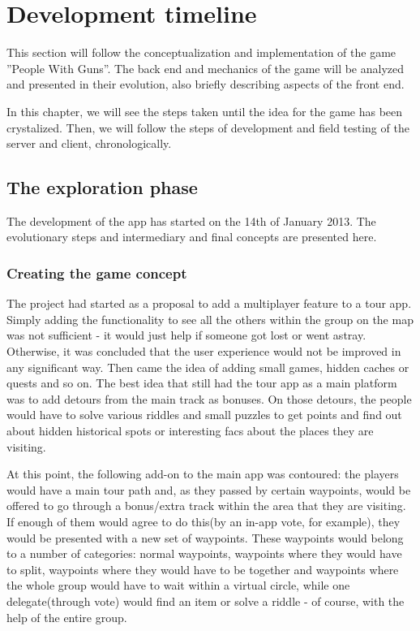 \section{Development timeline}

This section will follow the conceptualization and implementation of
the game ''People With Guns''. The back end and mechanics of the game will be
analyzed and presented in their evolution, also briefly describing aspects of
the front end. \newline

In this chapter, we will see the steps taken until the idea for the game has
been crystalized. Then, we will follow the steps of development and field
testing of the server and client, chronologically.


\subsection{The exploration phase}

The development of the app has started on the 14th of January 2013.
The evolutionary steps and intermediary and final concepts are presented here.\newline

\subsubsection{Creating the game concept}

The project had started as a proposal to add a multiplayer feature to a tour
app. Simply adding the functionality to see all the others within the group on
the map was not sufficient - it would just help if someone got lost or went
astray. Otherwise, it was concluded that the user experience would not be
improved in any significant way. Then came the idea of adding small games,
hidden caches or quests and so on. The best idea that still had the tour app as
a main platform was to add detours from the main track as bonuses. On those
detours, the people would have to solve various riddles and small puzzles to get
points and find out about hidden historical spots or interesting facs about the
places they are visiting. \newline

At this point, the following add-on to the main app was contoured: the
players would have a main tour path and, as they passed by certain waypoints,
would be offered to go through a bonus/extra track within the area that they are
visiting. If enough of them would agree to do this(by an in-app vote, for
example), they would be presented with a new set of waypoints. These waypoints
would belong to a number of categories: normal waypoints, waypoints where they
would have to split, waypoints where they would have to be together and
waypoints where the whole group would have to wait within a virtual circle,
while one delegate(through vote) would find an item or solve a riddle -
of course, with the help of the entire group.\newline

